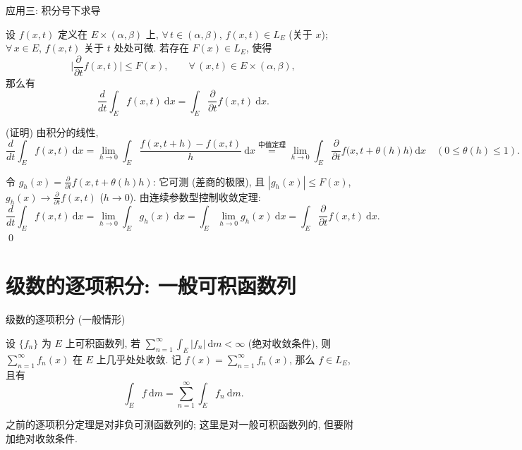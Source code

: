 
\begin{frame}{应用三: 积分号下求导}

\begin{thm}[积分号下求导]
设 $f(x, t)$ 定义在 $E \times (\alpha, \beta)$ 上, $\forall\, t \in (\alpha, \beta)$,
$f(x, t) \in L_E$ (关于 $x$); $\forall\, x \in E$, $f(x, t)$ 关于 $t$ 处处可微.
若存在 $F(x) \in L_E$, 使得
\[
\Big| \frac{\partial}{\partial t} f(x, t) \Big| \leqslant F(x),
\qquad \forall\, (x, t) \in E \times (\alpha, \beta) ,
\]
那么有
\[
\frac{d}{dt} \int_E f(x, t) ~ \mathrm{d}x
= \int_E \frac{\partial}{\partial t} f(x, t) ~ \mathrm{d}x .
\]
\end{thm}

\startproof[bg=yellow, fg=red](证明)
由积分的线性,
\[
\frac{d}{dt} \int_E f(x, t) ~ \mathrm{d}x
= \lim_{h \to 0} \int_E \frac{f(x, t+h) - f(x, t)}{h} ~ \mathrm{d}x
\overset{\text{中值定理}}{=}
\lim_{h \to 0} \int_E \frac{\partial}{\partial t} f\big( x, t + \theta(h) h \big) ~ \mathrm{d}x
\quad (0 \leqslant \theta(h) \leqslant 1) .
\]

\pause

令 $g_h(x) = \frac{\partial}{\partial t} f(x, t + \theta(h) h)$: 它可测 (差商的极限), 且
$|g_h(x)| \leqslant F(x)$, $g_h(x) \to \frac{\partial}{\partial t} f(x, t)$ ($h \to 0$).
由连续参数型控制收敛定理:
\[
\frac{d}{dt} \int_E f(x, t) ~ \mathrm{d}x
= \lim_{h \to 0} \int_E g_h(x) ~ \mathrm{d}x
= \int_E \lim_{h \to 0} g_h(x) ~ \mathrm{d}x
= \int_E \frac{\partial}{\partial t} f(x, t) ~ \mathrm{d}x .
\]
\qed

\end{frame}


\section[绝对收敛]{级数的逐项积分: 一般可积函数列}


\begin{frame}{级数的逐项积分 (一般情形)}

\begin{thm}[逐项积分]
设 $\{f_n\}$ 为 $E$ 上可积函数列, 若
$\displaystyle \sum_{n=1}^{\infty} \int_E |f_n| ~ \mathrm{d} m < \infty$
(\alert{绝对收敛}条件), 则 $\sum_{n=1}^{\infty} f_n(x)$ 在 $E$ 上几乎处处收敛. 记
$f(x) = \sum_{n=1}^{\infty} f_n(x)$, 那么 $f \in L_E$, 且有
\[
\int_E f ~ \mathrm{d} m = \sum_{n=1}^{\infty} \int_E f_n ~ \mathrm{d} m .
\]
\end{thm}

\pause

\begin{remark}
之前的逐项积分定理是对\alert{非负可测}函数列的; 这里是对\alert{一般可积}函数列的,
但要附加绝对收敛条件.
\end{remark}

\end{frame}

